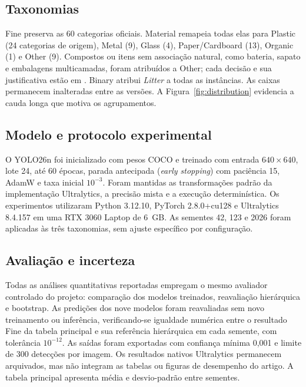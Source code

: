 \subsection{Taxonomias}

Fine preserva as 60 categorias oficiais. Material remapeia todas elas para Plastic (24 categorias de origem), Metal (9), Glass (4), Paper/Cardboard (13), Organic (1) e Other (9). Compostos ou itens sem associação natural, como bateria, sapato e embalagens multicamadas, foram atribuídos a Other; cada decisão e sua justificativa estão em . Binary atribui \textit{Litter} a todas as instâncias. As caixas permanecem inalteradas entre as versões. A Figura~\ref{fig:distribution} evidencia a cauda longa que motiva os agrupamentos.

\subsection{Modelo e protocolo experimental}

O YOLO26n foi inicializado com pesos COCO e treinado com entrada $640\times640$, lote 24, até 60 épocas, parada antecipada (\textit{early stopping}) com paciência 15, AdamW \cite{loshchilov2019adamw} e taxa inicial $10^{-3}$. Foram mantidas as transformações padrão da implementação Ultralytics, a precisão mista e a execução determinística. Os experimentos utilizaram Python 3.12.10, PyTorch 2.8.0+cu128 e Ultralytics 8.4.157 em uma RTX 3060 Laptop de 6~GB. As sementes 42, 123 e 2026 foram aplicadas às três taxonomias, sem ajuste específico por configuração.

\subsection{Avaliação e incerteza}

Todas as análises quantitativas reportadas empregam o mesmo avaliador controlado do projeto: comparação dos modelos treinados, reavaliação hierárquica e bootstrap. As predições dos nove modelos foram reavaliadas sem novo treinamento ou inferência, verificando-se igualdade numérica entre o resultado Fine da tabela principal e sua referência hierárquica em cada semente, com tolerância $10^{-12}$. As saídas foram exportadas com confiança mínima 0,001 e limite de 300 detecções por imagem. Os resultados nativos Ultralytics permanecem arquivados, mas não integram as tabelas ou figuras de desempenho do artigo. A tabela principal apresenta média e desvio-padrão entre sementes.

